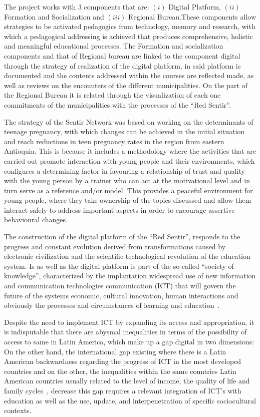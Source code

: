 \documentclass[journal,transmag]{IEEEtran}
\begin{document}
The project works with 3 components that are: $(i)$ Digital Platform, $(ii)$ Formation and Socialization and $(iii)$ Regional Bureau.These components allow strategies to be activated pedagogics from technology, memory and research, with which a pedagogical addressing is achieved that produces comprehensive, holistic and meaningful educational processes. The Formation and socialization components and that of Regional bureau are linked to the component digital through the strategy of realization of the digital platform, in said platform is documented and the contents addressed within the courses are reflected made, as well as reviews on the encounters of the different municipalities. On the part of the Regional Bureau it is related through the visualization of each one commitments of the municipalities with the processes of the ``Red Sentir''.

The strategy of the Sentir Network was based on working on the determinants of teenage pregnancy, with which changes can be achieved in the initial situation and reach reductions in teen pregnancy rates in the region from eastern Antioquia. This is because it includes a methodology where the activities that are carried out promote interaction with young people and their environments, which configures a determining factor in favouring a relationship of trust and quality with the young person by a trainer who can act at the motivational level and in turn serve as a reference and/or model. This provides a peaceful environment for young people, where they take ownership of the topics discussed and allow them interact safely to address important aspects in order to encourage assertive behavioural changes. 

The construction of the digital platform of the ``Red Sentir'', responds to the progress and constant evolution derived from transformations caused by electronic civilization and the scientific-technological revolution of the education system. Is as well as the digital platform is part of the so-called ``society of knowledge'', characterized by the implantation widespread use of new information and communication technologies communication (ICT) that will govern the future of the systems economic, cultural innovation, human interactions and obviously the processes and circumstances of learning and education~\cite{Asin2009}.

Despite the need to implement ICT by expanding its access and appropriation, it is indisputable that there are abysmal inequalities in terms of the possibility of access to same in Latin America, which make up a gap digital in two dimensions: On the other hand, the international gap existing where there is a Latin American backwardness regarding the progress of ICT in the most developed countries and on the other, the inequalities within the same countries Latin American countries usually related to the level of income, the quality of life and family cycles~\cite{Sunkel2006}, decrease this gap requires a relevant integration of ICT's with education as well as the use, update, and interpenetration of specific sociocultural contexts.
\end{document}
